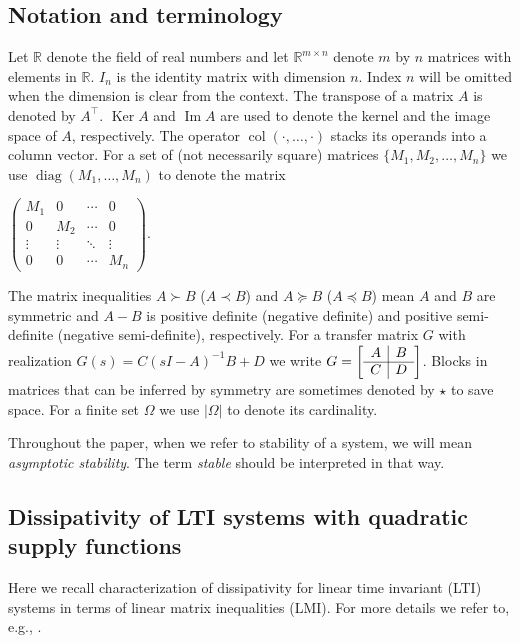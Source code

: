 \documentclass[11pt,a4paper,oneside,DIV=12,headings=small]{scrartcl}
\newcommand{\Rset}{\mathbb{R}}
\newcommand{\Sset}{\mathbb{S}}
\newcommand{\diag}{\operatorname{diag}}
\newcommand{\col}{\operatorname{col}}
\newcommand{\image}{\operatorname{Im}}
\newcommand{\kernel}{\operatorname{Ker}}
\theoremstyle{plain}
\begin{document}
\subsection{Notation and terminology}
Let $\Rset$ denote the field of real numbers and let $\Rset^{m\times n}$ denote $m$ by $n$ matrices with elements in $\Rset$. $I_n$ is the identity matrix with dimension $n$. Index $n$ will be omitted when the dimension is clear from the context.
The transpose of a matrix $A$ is denoted by $A^{\top}$. 
$\kernel{A}$ and $\image{A}$ are used to denote the kernel and the image space of $A$, respectively.
The operator $\col(\cdot,\ldots,\cdot)$ stacks its operands into a column vector.
For a set of (not necessarily square) matrices $\{M_1, M_2, \ldots, M_n\}$ we use $\diag(M_1,\ldots,M_n)$ to denote the matrix \begin{footnotesize}$\begin{pmatrix} M_1 & 0 & \cdots & 0 \\ 0 & M_2 & \cdots & 0 \\ \vdots & \vdots & \ddots & \vdots \\ 0 & 0 & \cdots & M_n \end{pmatrix}$. \end{footnotesize}
The matrix inequalities $A\succ B$ ($A \prec B$) and $A\succeq B$ ($A \preceq B$) mean $A$ and $B$ are symmetric and $A-B$ is positive definite (negative definite) and positive semi-definite (negative semi-definite), respectively.
For a transfer matrix $G$ with realization $G(s)=C(sI-A)^{-1}B+D$ we write $G=\left[\begin{array}{c | c} A & B \\ \hline C & D \end{array} \right]$. 
Blocks in matrices that can be inferred by symmetry are sometimes denoted by $\star$ to save space.
For a finite set $\Omega$ we use $|\Omega|$ to denote its cardinality.

Throughout the paper, when we refer to stability of a system, we will mean \emph{asymptotic stability}. The term \emph{stable} should be interpreted in that way.     

\subsection{Dissipativity of LTI systems with quadratic supply functions}
\label{Sec2_B}
Here we recall characterization of dissipativity for linear time invariant (LTI) systems in terms of linear matrix inequalities (LMI). For more details we refer to, e.g., \cite{SchererWeiland}. 
\end{document}
